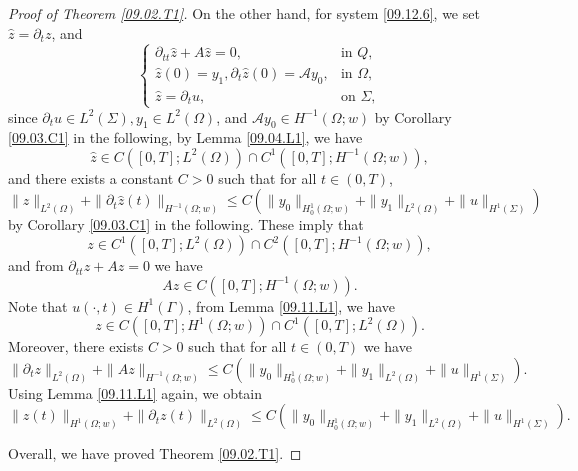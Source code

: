 \documentclass[10pt,a4paper]{amsart}
\def\Ga{\Gamma}
\def\Om{\Omega}
\def\mcA{\mathcal{A}}
\def\pt{\partial}
\def\wh{\widehat}
\begin{document}
\begin{proof}[Proof of Theorem \ref{09.02.T1}]
	On the other hand, for system \eqref{09.12.6}, we set $\wh z=\pt_tz$, and 
	\begin{equation*}
		\begin{cases}
			\pt_{tt}\wh z+A \wh z=0, &\mbox{in }Q, \\
			\wh z(0)=y_1, \pt_t\wh z(0)=\mcA y_0, &\mbox{in } \Om,\\
			\wh z=\pt_t u, &\mbox{on }\Sigma, 
		\end{cases}
	\end{equation*}
	since $\pt_tu\in L^2(\Sigma), y_1\in L^2(\Om)$, and $\mcA y_0\in H^{-1}(\Om;w)$ by Corollary \ref{09.03.C1} in the following, by Lemma \ref{09.04.L1}, we have 
	\begin{equation*}
		\wh z\in C([0,T]; L^2(\Om))\cap C^1([0,T]; H^{-1}(\Om;w)), 
	\end{equation*}
	and there exists a constant $C>0$ such that for all $t\in (0,T)$, 
	\begin{equation*}
		\|\wh z\|_{L^2(\Om)}+\|\pt_t\wh z(t)\|_{H^{-1}(\Om;w)}\leq C\left(\|y_0\|_{H_0^1(\Om;w)}+\|y_1\|_{L^2(\Om)}+\|u\|_{H^1(\Sigma)}\right)
	\end{equation*}
	by Corollary \ref{09.03.C1} in the following. 
	These imply that 
	\begin{equation*}
		z\in C^1([0,T]; L^2(\Om))\cap C^2([0,T]; H^{-1}(\Om;w)), 
	\end{equation*}
	and from $\pt_{tt}z+A z=0$ we have 
	\begin{equation*}
		Az\in C([0,T]; H^{-1}(\Om;w)). 
	\end{equation*}
	Note that $u(\cdot, t)\in H^1(\Ga)$, from Lemma \ref{09.11.L1}, we have 
	\begin{equation*}
		z\in C([0,T]; H^1(\Om;w))\cap C^1([0,T]; L^2(\Om)). 
	\end{equation*}
	Moreover, there exists $C>0$ such that for all $t\in (0,T)$ we have 
	\begin{equation*}
		\|\pt_tz\|_{L^2(\Om)}+\|Az\|_{H^{-1}(\Om;w)}\leq C\left(\|y_0\|_{H_0^1(\Om;w)}+\|y_1\|_{L^2(\Om)}+\|u\|_{H^1(\Sigma)}\right). 
	\end{equation*}
	Using Lemma \ref{09.11.L1} again, we obtain 
	\begin{equation*}
		\|z(t)\|_{H^1(\Om;w)}+\|\pt_t z(t)\|_{L^2(\Om)}\leq C\left(\|y_0\|_{H_0^1(\Om;w)}+\|y_1\|_{L^2(\Om)}+\|u\|_{H^1(\Sigma)}\right). 
	\end{equation*}
	
	Overall, we have proved Theorem \ref{09.02.T1}. 
\end{proof}
\end{document}
